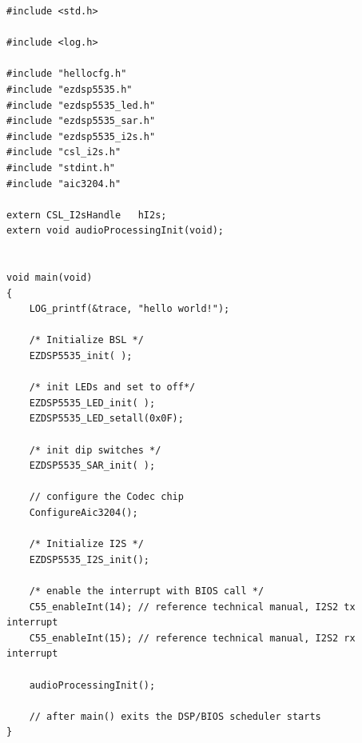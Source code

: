 \documentclass[11pt,pdftex,portrait,letterpaper]{article}
\begin{document}
\begin{lstlisting}[caption={main.c}, label=l:programx]
#include <std.h>

#include <log.h>

#include "hellocfg.h"
#include "ezdsp5535.h"
#include "ezdsp5535_led.h"
#include "ezdsp5535_sar.h"
#include "ezdsp5535_i2s.h"
#include "csl_i2s.h"
#include "stdint.h"
#include "aic3204.h"

extern CSL_I2sHandle   hI2s;
extern void audioProcessingInit(void);


void main(void)
{
    LOG_printf(&trace, "hello world!");

    /* Initialize BSL */
    EZDSP5535_init( );

    /* init LEDs and set to off*/
    EZDSP5535_LED_init( );
    EZDSP5535_LED_setall(0x0F);

    /* init dip switches */
    EZDSP5535_SAR_init( );

    // configure the Codec chip
    ConfigureAic3204();

    /* Initialize I2S */
    EZDSP5535_I2S_init();

    /* enable the interrupt with BIOS call */
    C55_enableInt(14); // reference technical manual, I2S2 tx interrupt
    C55_enableInt(15); // reference technical manual, I2S2 rx interrupt

    audioProcessingInit();

    // after main() exits the DSP/BIOS scheduler starts
}

\end{lstlisting}
\pagebreak
\end{document}
